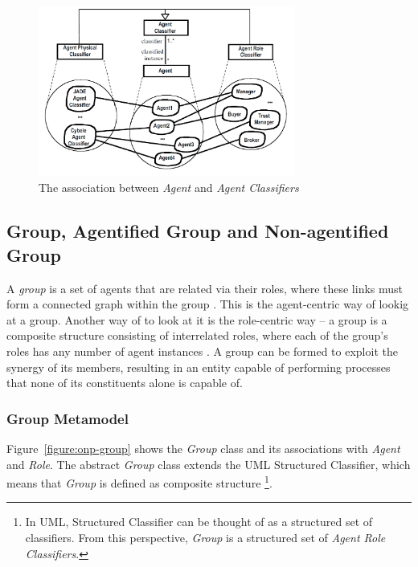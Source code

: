 \begin{figure}[ht]
	\centering
	\includegraphics[width=0.75\textwidth]{images/onp/agent-agent-classifier-association.png}
	\caption{The association between \textit{Agent} and \textit{Agent Classifiers} \cite{Odell05}}
	\label{figure:onp-agent-agent-classifier-association}
\end{figure}

\subsection{Group, Agentified Group and Non-agentified Group}

A \textit{group} is a set of agents that are related via their roles, where these links must form
a connected graph within the group \cite{Odell05}.
This is the agent-centric way of lookig at a group.
Another way of to look at it is the role-centric way -- a group is a composite structure consisting of interrelated roles, where each of the group's roles has any number of agent instances \cite{Odell05}.
A group can be formed to exploit the synergy of its members, resulting in an entity capable of performing processes that none of its constituents alone is capable of.

\subsubsection*{Group Metamodel}

Figure~\ref{figure:onp-group} shows the \textit{Group} class and its associations with \textit{Agent} and \textit{Role}.
The abstract \textit{Group} class extends the UML Structured Classifier, which means that \textit{Group} is defined as composite structure
\footnote{In UML, Structured Classifier can be thought of as a structured set of classifiers. From this perspective, \textit{Group} is a structured set of \textit{Agent Role Classifiers}.}.

